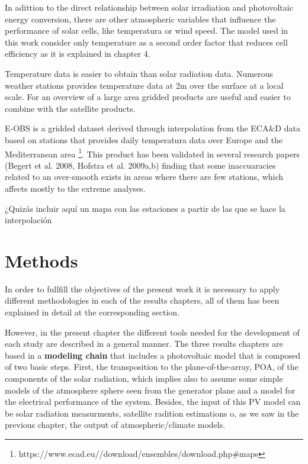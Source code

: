   In adittion to the direct relationship between solar irradiation and photovoltaic energy conversion, there are other atmospheric variables that influence the performance of solar cells, like temperatura or wind speed. The model used in this work consider only temperature as a second order factor that reduces cell efficiency as it is explained in chapter 4.
 
  Temperature data is easier to obtain than solar radiation data. Numerous weather stations provides temperature data at 2m over the surface at a local scale. For an overview of a large area gridded products are useful and easier to combine with the satellite products.

  E-OBS is a gridded dataset derived through interpolation from the ECA\&D data based on stations that provides daily temperatura data over Europe and the Mediterranean area \footnote{https://www.ecad.eu//download/ensembles/download.php#maps}. This product has been validated in several research papers (Begert et al. 2008, Hofstra et al. 2009a,b) finding that some inaccuaracies related to an over-smooth exists in areas where there are few stations, which affects mostly to the extreme analyses.

{\color{red} ¿Quizás incluir aquí un mapa con las estaciones a partir de las que se hace la interpolación}  
\chapter{Methods\label{cha:methods}}

In order to fullfill the objectives of the present work it is necessary to apply different methodologies in each of the results chapters, all of them has been explained in detail at the corresponding section. %

However, in the present chapter the different tools needed for the development of each study are described in a general manner. The three results chapters are based in a \textbf{modeling chain} that includes a photovoltaic model that is composed of two basic steps. First, the transposition to the plane-of-the-array, POA, of the components of the solar radiation, which implies also to assume some simple models of the atmosphere sphere seen from the generator plane and a model for the electrical performance of the system. Besides, the input of this PV model can be solar radiation measurments, satellite radition estimations o, as we saw in the previous chapter, the output of atmospheric/climate models. 

